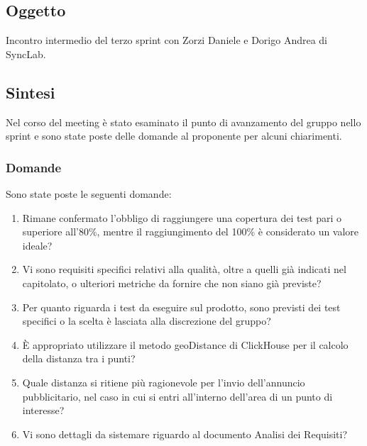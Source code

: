 \documentclass[10pt]{article}
\begin{document}
\subsection{Oggetto}
Incontro intermedio del terzo sprint con Zorzi Daniele e Dorigo Andrea di SyncLab.

\subsection{Sintesi}
Nel corso del meeting è stato esaminato il punto di avanzamento del gruppo nello sprint e sono state poste delle domande al proponente per alcuni chiarimenti.

\subsubsection{Domande}
Sono state poste le seguenti domande:
\begin{enumerate}
    \item Rimane confermato l'obbligo di raggiungere una copertura dei test pari o superiore all'80\%, mentre il raggiungimento del 100\% è considerato un valore ideale?
    \item Vi sono requisiti specifici relativi alla qualità, oltre a quelli già indicati nel capitolato, o ulteriori metriche da fornire che non siano già previste?
    \item Per quanto riguarda i test da eseguire sul prodotto, sono previsti dei test specifici o la scelta è lasciata alla discrezione del gruppo?
    \item È appropriato utilizzare il metodo geoDistance di ClickHouse per il calcolo della distanza tra i punti?
    \item Quale distanza si ritiene più ragionevole per l'invio dell'annuncio pubblicitario, nel caso in cui si entri all'interno dell'area di un punto di interesse?
    \item Vi sono dettagli da sistemare riguardo al documento Analisi dei Requisiti?
\end{enumerate}
\end{document}
